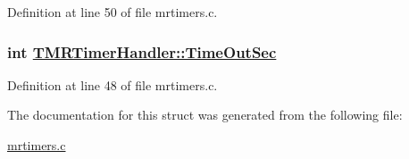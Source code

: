 Definition at line 50 of file mrtimers.c.\hypertarget{structTMRTimerHandler_2da8162b04f70a60ac2bc7b37d97e5a1}{
\subsubsection[TimeOutSec]{\setlength{\rightskip}{0pt plus 5cm}int \hyperlink{structTMRTimerHandler_2da8162b04f70a60ac2bc7b37d97e5a1}{TMRTimer\-Handler::Time\-Out\-Sec}}}
\label{structTMRTimerHandler_2da8162b04f70a60ac2bc7b37d97e5a1}




Definition at line 48 of file mrtimers.c.

The documentation for this struct was generated from the following file:\begin{CompactItemize}
\item 
\hyperlink{mrtimers_8c}{mrtimers.c}\end{CompactItemize}

